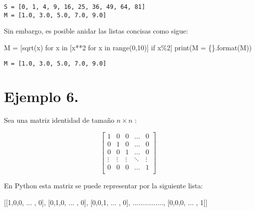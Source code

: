 \documentclass[
  letterpaper,
  DIV=11,
  numbers=noendperiod]{scrreprt}
\newenvironment{Shaded}{\begin{snugshade}}{\end{snugshade}}
\newcommand{\BuiltInTok}[1]{\textcolor[rgb]{0.00,0.23,0.31}{#1}}
\newcommand{\ControlFlowTok}[1]{\textcolor[rgb]{0.00,0.23,0.31}{#1}}
\newcommand{\DecValTok}[1]{\textcolor[rgb]{0.68,0.00,0.00}{#1}}
\newcommand{\KeywordTok}[1]{\textcolor[rgb]{0.00,0.23,0.31}{#1}}
\newcommand{\NormalTok}[1]{\textcolor[rgb]{0.00,0.23,0.31}{#1}}
\newcommand{\OperatorTok}[1]{\textcolor[rgb]{0.37,0.37,0.37}{#1}}
\newcommand{\SpecialCharTok}[1]{\textcolor[rgb]{0.37,0.37,0.37}{#1}}
\newcommand{\StringTok}[1]{\textcolor[rgb]{0.13,0.47,0.30}{#1}}
\begin{document}
\begin{verbatim}
S = [0, 1, 4, 9, 16, 25, 36, 49, 64, 81]
M = [1.0, 3.0, 5.0, 7.0, 9.0]
\end{verbatim}

Sin embargo, es posible anidar las listas concisas como sigue:

\begin{Shaded}
\begin{Highlighting}[]
\NormalTok{M }\OperatorTok{=}\NormalTok{ [sqrt(x) }\ControlFlowTok{for}\NormalTok{ x }\KeywordTok{in}\NormalTok{ [x}\OperatorTok{**}\DecValTok{2} \ControlFlowTok{for}\NormalTok{ x }\KeywordTok{in} \BuiltInTok{range}\NormalTok{(}\DecValTok{0}\NormalTok{,}\DecValTok{10}\NormalTok{)] }\ControlFlowTok{if}\NormalTok{ x}\OperatorTok{\%}\DecValTok{2}\NormalTok{]}
\BuiltInTok{print}\NormalTok{(}\StringTok{\textquotesingle{}M = }\SpecialCharTok{\{\}}\StringTok{\textquotesingle{}}\NormalTok{.}\BuiltInTok{format}\NormalTok{(M))}
\end{Highlighting}
\end{Shaded}

\begin{verbatim}
M = [1.0, 3.0, 5.0, 7.0, 9.0]
\end{verbatim}

\section{\texorpdfstring{\textbf{Ejemplo
6.}}{Ejemplo 6.}}\label{ejemplo-6.-2}

Sea una matriz identidad de tamaño \(n \times n\) :

\[
\left[
\begin{matrix}
1 & 0 & 0 & \dots & 0 \\
0 & 1 & 0 & \dots & 0 \\
0 & 0 & 1 & \dots & 0 \\
\vdots&\vdots&\vdots&\ddots&\vdots \\
0 & 0 & 0 & \dots & 1 \\
\end{matrix}
\right]
\]

En Python esta matriz se puede representar por la siguiente lista:

\begin{Shaded}
\begin{Highlighting}[]
\NormalTok{[[}\DecValTok{1}\NormalTok{,}\DecValTok{0}\NormalTok{,}\DecValTok{0}\NormalTok{, ... , }\DecValTok{0}\NormalTok{],}
\NormalTok{ [}\DecValTok{0}\NormalTok{,}\DecValTok{1}\NormalTok{,}\DecValTok{0}\NormalTok{, ... , }\DecValTok{0}\NormalTok{],}
\NormalTok{ [}\DecValTok{0}\NormalTok{,}\DecValTok{0}\NormalTok{,}\DecValTok{1}\NormalTok{, ... , }\DecValTok{0}\NormalTok{],}
\NormalTok{ ................,     }
\NormalTok{ [}\DecValTok{0}\NormalTok{,}\DecValTok{0}\NormalTok{,}\DecValTok{0}\NormalTok{, ... , }\DecValTok{1}\NormalTok{]]}
\end{Highlighting}
\end{Shaded}
\end{document}
